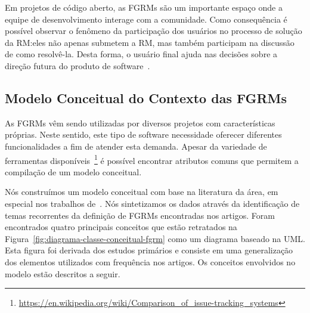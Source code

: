 Em projetos de código aberto, as FGRMs são um importante espaço onde a equipe de
desenvolvimento interage com a comunidade. Como consequência é possível observar
o fenômeno da participação dos usuários no processo de solução da RM:\@ eles não
apenas submetem a RM, mas também participam na discussão de como resolvê-la.
Desta forma, o usuário final ajuda nas decisões sobre a direção futura do
produto de software~\cite{breu2010information}.

\subsection{Modelo Conceitual do Contexto das FGRMs}
\label{sub:espectro_funcionalidades_fgrm}

As FGRMs vêm sendo utilizadas por diversos projetos com características
próprias. Neste sentido, este tipo de software necessidade oferecer diferentes
funcionalidades a fim de atender esta demanda. Apesar da variedade de
ferramentas
disponíveis~\footnote{\url{https://en.wikipedia.org/wiki/Comparison_of_issue-tracking_systems}}
é possível encontrar atributos comuns que permitem a compilação de um modelo
conceitual.

Nós construímos um modelo conceitual com base na literatura da área, em especial
nos trabalhos de~\cite{cavalcanti2014challenges, singh2011bug,
    kshirsagar2015issue}. Nós sintetizamos os dados através da identificação de
temas recorrentes da definição de FGRMs encontradas nos artigos. Foram
encontrados quatro principais conceitos que estão retratados na
Figura~\ref{fig:diagrama-classe-conceitual-fgrm} como um diagrama baseado na
UML\@. Esta figura foi derivada dos estudos primários e consiste em uma
generalização dos elementos utilizados com frequência nos artigos. Os conceitos
envolvidos no modelo estão descritos a seguir.

